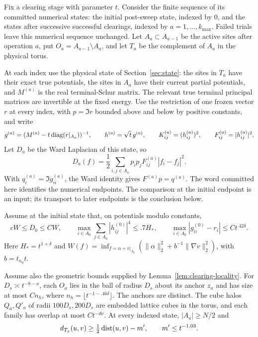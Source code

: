 \begin{proposition}
\label{prop:committed-assembly}
Fix a clearing stage with parameter $t$. Consider the finite sequence of
its committed numerical states: the initial post-sweep state, indexed by
$0$, and the states after successive successful clearings, indexed by
$a=1,\ldots,k_{\max}$. Failed trials leave this numerical sequence
unchanged. Let $A_a\subset A_{a-1}$ be the active sites after operation
$a$, put $O_a=A_{a-1}\setminus A_a$, and let $T_a$ be the complement of
$A_a$ in the physical torus.

At each index use the physical state of Section~\ref{sec:state}: the
sites in $T_a$ have their exact true potentials, the sites in $A_a$ have
their current partial potentials, and $M^{(a)}$ is the real terminal-Schur
matrix. The relevant true terminal principal matrices are invertible at
the fixed energy. Use the restriction of one frozen vector $r$ at every
index, with $p=\Im r$ bounded above and below by positive constants, and
write
\[
 g^{(a)}=(M^{(a)}-t\operatorname{diag}(r|_{A_a}))^{-1},\qquad
 h^{(a)}=\sqrt t\,g^{(a)},\qquad
 K^{(a)}_{ij}=(h^{(a)}_{ij})^2,\qquad
 F^{(a)}_{ij}=|h^{(a)}_{ij}|^2.
\]
Let $D_a$ be the Ward Laplacian of this state, so
\[
 D_a(f)=\frac12\sum_{i,j\in A_a}p_ip_jF^{(a)}_{ij}|f_i-f_j|^2.
\]
With $q_i^{(a)}=\Im g^{(a)}_{ii}$, the Ward identity gives
$F^{(a)}p=q^{(a)}$.
The word committed here identifies the numerical endpoints. The comparison
at the initial endpoint is an input; its transport to later endpoints is
the conclusion below.

Assume at the initial state that, on potentials modulo constants,
\begin{equation}
 cW\le D_0\le CW,\qquad
 \max_{i\in A_0}\sum_{j\in A_0}|h^{(0)}_{ij}|^4
 \le .7H_*,\qquad
 \max_{i\in A_0}|g^{(0)}_{ii}-r_i|\le Ct^{.42\delta}.
 \label{eq:assembly-initial-data}
\end{equation}
Here $H_*=t^{1+\delta}$ and
$W(f)=\inf_{f=\alpha+v|_{A_0}}
 (\|\alpha\|_2^2+b^{-1}\|\nabla v\|_2^2)$, with $b=t_{n_0}t$.

Assume also the geometric bounds supplied by
Lemma~\ref{lem:clearing-locality}. For $D_s\asymp t^{-8-\nu}$, each
$O_a$ lies in the ball of radius $D_s$ about its anchor $z_a$ and has
size at most $Cn_h$, where $n_h=\lfloor t^{-1-.46\delta}\rfloor$.
The anchors are distinct. The cube halos $Q_a,Q'_a$
of radii $100D_s,200D_s$ are embedded lattice cubes in the torus, and
each family has overlap at most $Ct^{-d\nu}$. At every indexed state,
$|A_a|\ge N/2$ and
\[
 d_{T_a}(u,v)\ge\tfrac12\operatorname{dist}(u,v)-m',\qquad m'\le t^{-1.03}.
\]


\end{proposition}
